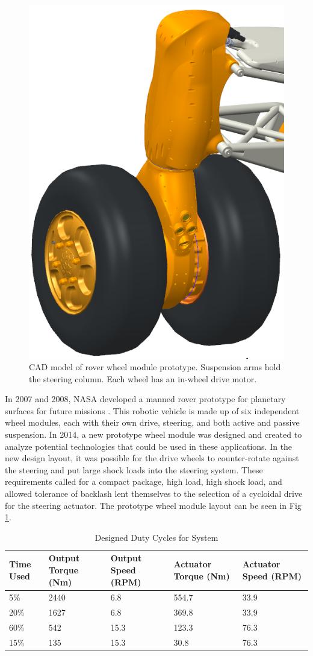 \begin{figure}[h]
   \centering
   \includegraphics[width=0.40\linewidth]{fig/wheel_module_CAD}
   \caption{CAD model of rover wheel module prototype.
   Suspension arms hold the steering column.
   Each wheel has an in-wheel drive motor.}
   \label{fig:wheel_module}
\end{figure}

In 2007 and 2008, NASA developed a manned rover prototype for planetary surfaces for future missions \cite{ref:rover}.
This robotic vehicle is made up of six independent wheel modules, each with their own drive, steering, and both active and passive suspension.
In 2014, a new prototype wheel module was designed and created to analyze potential technologies that could be used in these applications.
In the new design layout, it was possible for the drive wheels to counter-rotate against the steering and put large shock loads into the steering system.
These requirements called for a compact package, high load, high shock load, and allowed tolerance of backlash lent themselves to the selection of a cycloidal drive for the steering actuator.
The prototype wheel module layout can be seen in Fig \ref{fig:wheel_module}.

\begin{table}[h]
  \vskip0.2cm
  \caption{Designed Duty Cycles for System}
  \label{table:duty_cycle}
  \begin{center}
    \vskip-0.2cm
    \begin{tabular}{|p{}||p{}||p{}| |p{}| |p{}|}
    \hline
    Time Used & Output Torque (Nm) & Output Speed (RPM) & Actuator Torque (Nm) & Actuator Speed (RPM)\\
    \hline
    5\% & 2440 & 6.8 & 554.7 & 33.9\\
    \hline
    20\% & 1627 & 6.8 & 369.8 & 33.9\\
    \hline
    60\% & 542 & 15.3 & 123.3 & 76.3\\
    \hline
    15\% & 135 & 15.3 & 30.8 & 76.3\\
    \hline
    \end{tabular}
  \end{center}
\end{table}

